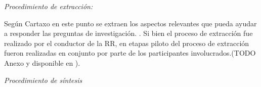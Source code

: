 \documentclass[conference]{IEEEtran}
\begin{document}









\textit{ Procedimiento de extracción: } 

Según Cartaxo en este punto se extraen  los aspectos  relevantes que pueda ayudar a responder las preguntas de investigación. \cite{cartaxo2018role} . Si bien el proceso de extracción fue realizado por el conductor de la RR, en etapas piloto del proceso de extracción fueron realizadas en conjunto por parte de los participantes involucrados.(TODO Anexo y disponible en ). %

\textit{Procedimiento de síntesis}
\end{document}
